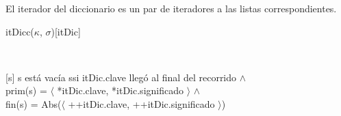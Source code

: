 \documentclass[a4paper,10pt]{article}
\begin{document}
\begin{Representacion}
  

  El iterador del diccionario es un par de iteradores a las listas correspondientes. 

  \begin{Estructura}{itDicc($\kappa$, $\sigma$)}[itDic]
    \begin{Tupla}[itDic]%
    \end{Tupla}
  \end{Estructura}


  ~

  [s]{
      s está vacía ssi itDic.clave llegó al final del recorrido $\land$ \\
      prim(s) = $\langle$ *itDic.clave, *itDic.significado $\rangle$ $\land$\\
      fin(s) = Abs($\langle$ ++itDic.clave, ++itDic.significado $\rangle$)
  }
\end{Representacion}
\end{document}
